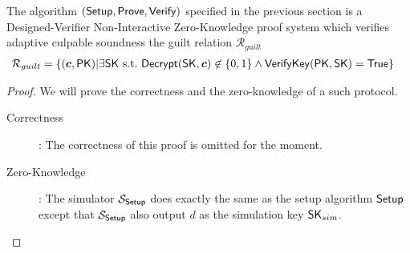\begin{theorem}
  The algorithm $({\mathsf{Setup}}, {\mathsf{Prove}}, {\mathsf{Verify}})$ specified in the previous section is a Designed-Verifier Non-Interactive Zero-Knowledge proof system
  which verifies adaptive culpable soundness \wrt the guilt relation $\mathcal{R}_{guilt}$
  \begin{align*}
    \mathcal{R}_{guilt} &= \{(\vec{c}, \PK) | \exists \SK~\st~\Dec(\SK, \vec{c}) \not \in \{0,1\}  \wedge {\mathsf{VerifyKey}}(\PK, \SK)  = \True\}
  \end{align*}
\end{theorem}

\begin{proof}
  We will prove the correctness and the zero-knowledge of a such protocol.
  \begin{description}
  \item[\textsf{Correctness}]: The correctness of this proof is omitted for the moment.
  \item[\textsf{Zero-Knowledge}]:
    The simulator $\mathcal{S}_{{\mathsf{Setup}}}$ does exactly the same as the setup algorithm ${\mathsf{Setup}}$ except that $\mathcal{S}_{{\mathsf{Setup}}}$ also output $d$ as the simulation key $\mathsf{SK}_{sim}$.


\end{description}
\end{proof}
